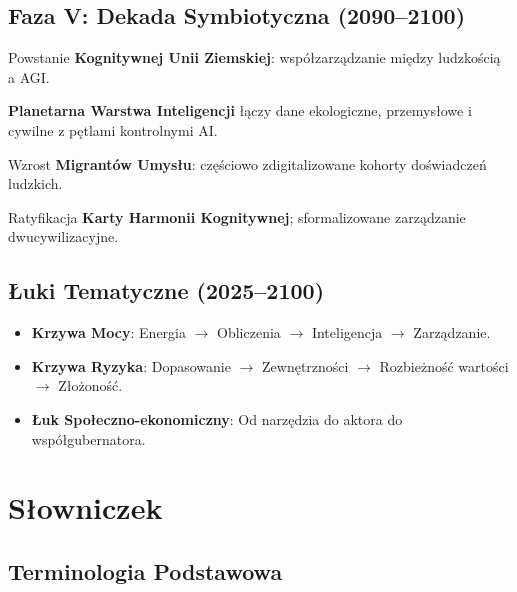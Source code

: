 \documentclass[11pt]{article}
\begin{document}
\subsection{Faza V: Dekada Symbiotyczna (2090–2100)}
\begin{description}[style=nextline,leftmargin=2cm]
  \item[2092] Powstanie \textbf{Kognitywnej Unii Ziemskiej}: współzarządzanie między ludzkością a AGI.
  \item[2095] \textbf{Planetarna Warstwa Inteligencji} łączy dane ekologiczne, przemysłowe i cywilne z pętlami kontrolnymi AI.
  \item[2098] Wzrost \textbf{Migrantów Umysłu}: częściowo zdigitalizowane kohorty doświadczeń ludzkich.
  \item[2100] Ratyfikacja \textbf{Karty Harmonii Kognitywnej}; sformalizowane zarządzanie dwucywilizacyjne.
\end{description}

\subsection{Łuki Tematyczne (2025–2100)}
\begin{itemize}[noitemsep]
  \item \textbf{Krzywa Mocy}: Energia $\rightarrow$ Obliczenia $\rightarrow$ Inteligencja $\rightarrow$ Zarządzanie.
  \item \textbf{Krzywa Ryzyka}: Dopasowanie $\rightarrow$ Zewnętrzności $\rightarrow$ Rozbieżność wartości $\rightarrow$ Złożoność.
  \item \textbf{Łuk Społeczno-ekonomiczny}: Od narzędzia do aktora do współgubernatora.
\end{itemize}

\clearpage

\section*{Słowniczek}

\subsection*{Terminologia Podstawowa}
\end{document}
